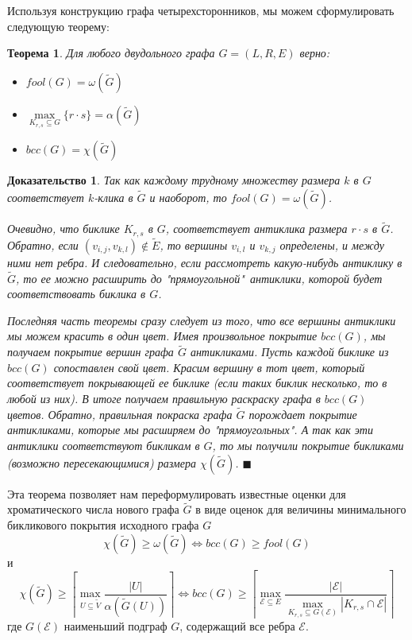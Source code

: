 \documentclass[a4paper]{article}
\newtheorem{mtheorem}{Теорема}[section]
\newtheorem*{msolution}{Доказательство}
\begin{document}
Используя конструкцию графа четырехсторонников, мы можем сформулировать следующую теорему:
\begin{mtheorem}
    Для любого двудольного графа $G = (L, R, E)$ верно:
    \begin{itemize}[noitemsep]
        \item[1)] $fool(G) = \omega(\widetilde{G})$
        \item[2)] $\max\limits_{K_{r,s}\subseteq G}\{r\cdot s\} = \alpha(\widetilde{G})$
        \item[3)] $bcc(G) = \chi(\widetilde{G})$
    \end{itemize}
\end{mtheorem}



\begin{msolution}
    Так как каждому трудному множеству размера $k$ в $G$ соответствует $k$-клика в $\widetilde{G}$ и 
    наоборот, то $fool(G) = \omega(\widetilde{G})$.
    
    Очевидно, что биклике $K_{r,s}$ в $G$, соответствует антиклика размера $r\cdot s$ в $\widetilde{G}$. 
    Обратно, если $(v_{i,j}, v_{k,l}) \notin \widetilde{E}$, то вершины $v_{i, l}$ и $v_{k, j}$ 
    определены, и между ними нет ребра. И следовательно, если рассмотреть какую-нибудь антиклику в 
    $\widetilde{G}$, то ее можно расширить до "прямоугольной"\  антиклики, которой будет соответствовать 
    биклика в $G$.
    
    Последняя часть теоремы сразу следует из того, что все вершины антиклики мы можем красить в один цвет. Имея 
    произвольное покрытие $bcc(G)$, мы получаем покрытие вершин графа $\widetilde{G}$ антикликами. 
    Пусть каждой биклике из $bcc(G)$ сопоставлен свой цвет. Красим вершину в тот цвет, который соответствует 
    покрывающей ее биклике (если таких биклик несколько, то в любой из них). В итоге получаем правильную 
    раскраску графа в $bcc(G)$ цветов. Обратно, правильная покраска графа $\widetilde{G}$ порождает 
    покрытие антикликами, которые мы расширяем до "прямоугольных". А так как эти антиклики
    соответствуют бикликам в $G$, то мы получили покрытие бикликами (возможно пересекающимися) 
    размера $\chi(\widetilde{G})$. $\blacksquare$
\end{msolution}

Эта теорема позволяет нам  переформулировать известные оценки для хроматического числа нового графа 
$\widetilde G$ в виде оценок для величины минимального бикликового покрытия исходного графа $G$
$$ \chi(\widetilde{G}) \geq \omega(\widetilde{G}) \Longleftrightarrow bcc(G) \geq fool(G)$$
и $$\chi(\widetilde{G}) \geq \left\lceil\max\limits_{U\subseteq \widetilde{V}}\frac{|U|}{\alpha(\widetilde{G}(U))}\right\rceil 
\Longleftrightarrow bcc(G) \geq \left\lceil\max\limits_{\mathcal{E}\subseteq E}\frac{|\mathcal{E}|}
{\max\limits_{K_{r,s}\subseteq G(\mathcal{E})}|K_{r,s}\cap\mathcal{E}|}\right\rceil$$ где $G(\mathcal{E})$ наименьший подграф $G$, 
содержащий все ребра $\mathcal{E}$. 
\end{document}
